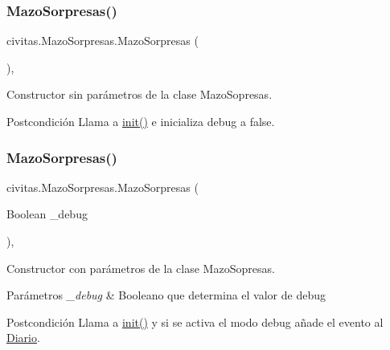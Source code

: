 \subsubsection{\texorpdfstring{Mazo\+Sorpresas()}{MazoSorpresas()}\hspace{0.1cm}{\footnotesize\ttfamily [1/2]}}
{\footnotesize\ttfamily civitas.\+Mazo\+Sorpresas.\+Mazo\+Sorpresas (\begin{DoxyParamCaption}{ }\end{DoxyParamCaption})\hspace{0.3cm}{\ttfamily [inline]}, {\ttfamily [package]}}



Constructor sin parámetros de la clase Mazo\+Sopresas. 

\begin{DoxyPostcond}{Postcondición}
Llama a \hyperlink{classcivitas_1_1MazoSorpresas_a8a5c58c8a162c9da0088678f3803c7dd}{init()} e inicializa debug a false. 
\end{DoxyPostcond}
\mbox{\label{classcivitas_1_1MazoSorpresas_a2768aba34debb139a79b22c6593e9acf}} 
\subsubsection{\texorpdfstring{Mazo\+Sorpresas()}{MazoSorpresas()}\hspace{0.1cm}{\footnotesize\ttfamily [2/2]}}
{\footnotesize\ttfamily civitas.\+Mazo\+Sorpresas.\+Mazo\+Sorpresas (\begin{DoxyParamCaption}\item[{Boolean}]{\+\_\+debug }\end{DoxyParamCaption})\hspace{0.3cm}{\ttfamily [inline]}, {\ttfamily [package]}}



Constructor con parámetros de la clase Mazo\+Sopresas. 


\begin{DoxyParams}{Parámetros}
{\em \+\_\+debug} & Booleano que determina el valor de debug \\
\hline
\end{DoxyParams}
\begin{DoxyPostcond}{Postcondición}
Llama a \hyperlink{classcivitas_1_1MazoSorpresas_a8a5c58c8a162c9da0088678f3803c7dd}{init()} y si se activa el modo debug añade el evento al \hyperlink{classcivitas_1_1Diario}{Diario}. 
\end{DoxyPostcond}


